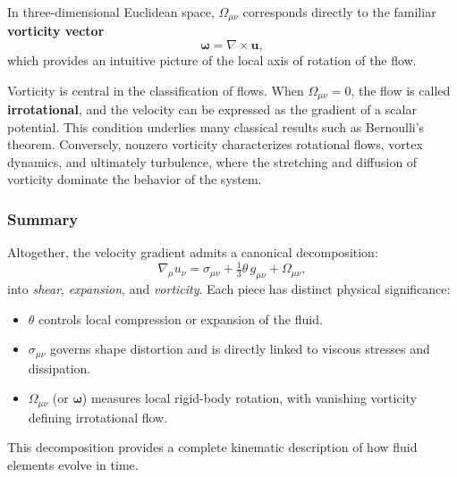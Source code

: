 In three-dimensional Euclidean space, $\Omega_{\mu\nu}$ corresponds directly to the familiar \textbf{vorticity vector} 
\[
\boldsymbol{\omega} = \nabla \times \mathbf{u},
\]
which provides an intuitive picture of the local axis of rotation of the flow. 

\par
Vorticity is central in the classification of flows. When $\Omega_{\mu\nu} = 0$, the flow is called \textbf{irrotational}, and the velocity can be expressed as the gradient of a scalar potential. This condition underlies many classical results such as Bernoulli’s theorem. Conversely, nonzero vorticity characterizes rotational flows, vortex dynamics, and ultimately turbulence, where the stretching and diffusion of vorticity dominate the behavior of the system.

\subsubsection*{Summary}

Altogether, the velocity gradient admits a canonical decomposition:
\[
\nabla_\mu u_\nu = \sigma_{\mu\nu} + \tfrac{1}{3}\theta\, g_{\mu\nu} + \Omega_{\mu\nu},
\]
into \emph{shear}, \emph{expansion}, and \emph{vorticity}. Each piece has distinct physical significance:
\begin{itemize}
  \item $\theta$ controls local compression or expansion of the fluid.
  \item $\sigma_{\mu\nu}$ governs shape distortion and is directly linked to viscous stresses and dissipation.
  \item $\Omega_{\mu\nu}$ (or $\boldsymbol{\omega}$) measures local rigid-body rotation, with vanishing vorticity defining irrotational flow.
\end{itemize}
This decomposition provides a complete kinematic description of how fluid elements evolve in time.

